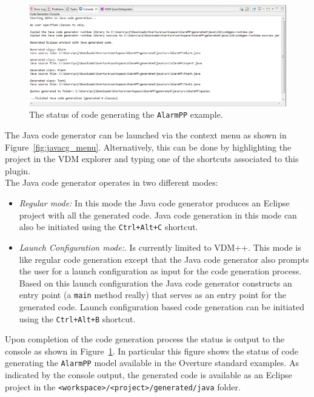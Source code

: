\begin{figure}[htbp]
\begin{center}
\includegraphics[width=\linewidth]{screenDumps/javacg_output}
\caption{The status of code generating the \texttt{AlarmPP}
example.\label{fig:javacg_output}}
\end{center}
\end{figure}

The Java code generator can be launched via the context menu as shown
in Figure~\ref{fig:javacg_menu}. Alternatively, this can be done by
highlighting the project in the VDM explorer and typing one of the
shortcuts associated to this plugin.\\

\noindent The Java code generator operates in two different modes:

\begin{itemize}

\item \emph{Regular mode:} In this mode the Java code generator
  produces an Eclipse project with all the generated code. Java code
  generation in this mode can also be initiated using the
  \texttt{Ctrl+Alt+C} shortcut.

\item \emph{Launch Configuration mode:}. Is currently limited to
  VDM++. This mode is like regular code generation except that the
  Java code generator also prompts the user for a launch configuration
  as input for the code generation process. Based on this launch
  configuration the Java code generator constructs an entry point (a
  \texttt{main} method really) that serves as an entry point for the
  generated code. Launch configuration based code generation can be
  initiated using the \texttt{Ctrl+Alt+B} shortcut.

\end{itemize}

\noindent Upon completion of the code generation process the status is
output to the console as shown in Figure~\ref{fig:javacg_output}. In
particular this figure shows the status of code generating the
\texttt{AlarmPP} model available in the Overture standard examples. As
indicated by the console output, the generated code is available as an
Eclipse project in the \texttt{<workspace>/<project>/generated/java}
folder.


